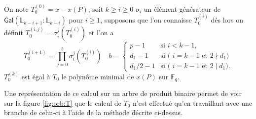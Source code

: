 \documentclass[10pt,a4paper]{book}
\theoremstyle{plain}
\theoremstyle{definition}
\theoremstyle{definition}
\theoremstyle{definition}
\theoremstyle{definition}
\theoremstyle{remark}
\theoremstyle{remark}
\theoremstyle{definition}
\begin{document}
On note $T_0^{(0)}=x-x(P)$, soit $k \geqslant i\geqslant 0$ $\sigma_i$ un élément générateur de $\mathsf{Gal}(\mathbb{L}_{k-i+1}:\mathbb{L}_{k-i})$ pour $i \geqslant 1$, supposons que l'on connaisse $T_0^{(i)}$ dés lors on définit $T_0^{(i,j)}=\sigma_i^j(T_0^{(i)})$ et l'on a 
\[
T_0^{(i+1)}=\prod_{j=0}^{b} \sigma_i^j(T_0^{(i)}) \quad  b = \begin{cases}
    p-1 &\text{si $i<k-1$,}\\
    d_1 -1  &\text{si ( $i=k-1$ et $2 \nmid d_1$)}\\
    d_1/2 - 1 &\text{si ( $i=k-1$ et $2 \mid d_1 $)}.
  \end{cases}
\]
 $T_0^{(k)}$ est égal à $T_0$ le polynôme minimal de $x(P)$ sur $\mathbb{F}_q$.

Une représentation de ce calcul sur un arbre de produit binaire permet de voir 
sur la figure \ref{fig:orb:T} que le calcul de $T_0$  n'est effectué qu'en 
travaillant avec une branche de celui-ci à l'aide de la méthode décrite 
ci-dessus.
\end{document}
